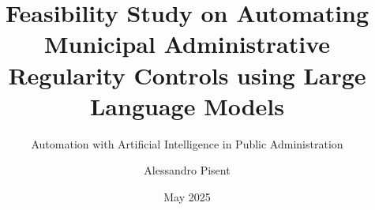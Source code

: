 
\documentclass[a4paper,english,noexaminfo]{sapthesis}
\usepackage{graphicx} %
\usepackage[hidelinks]{hyperref} %
\usepackage[nottoc]{tocbibind} %
\usepackage{pdfpages} %

\usepackage{float} %

\usepackage{textcomp}





\graphicspath{ {./Graphs/} }


\title{Feasibility Study on Automating Municipal Administrative Regularity Controls using Large Language Models}
\subtitle{Automation with Artificial Intelligence in Public Administration}



\author{Alessandro Pisent}




\date{May 2025}


\usepackage{subfiles}




